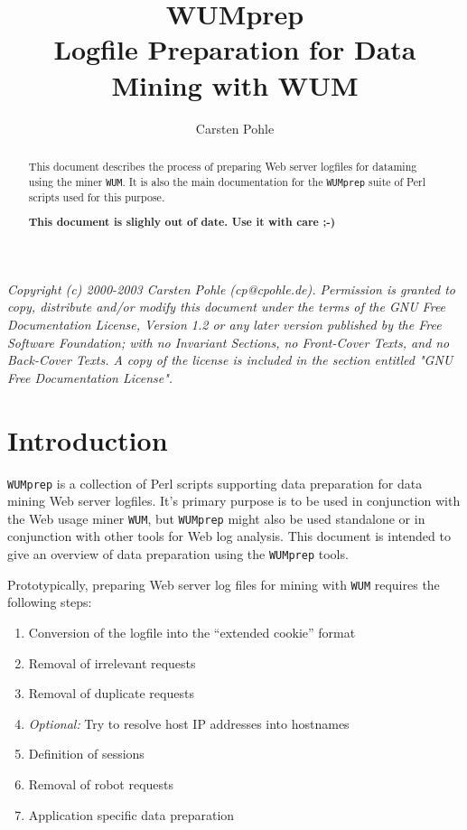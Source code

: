 \documentclass[a4paper]{article}
\begin{document}
\title{WUMprep \\  
  Logfile Preparation for Data Mining with WUM}
\author{Carsten Pohle}
\maketitle

\textsl{Copyright (c) 2000-2003 Carsten Pohle (cp@cpohle.de).
Permission is granted to copy, distribute and/or modify this document under
the terms of the GNU Free Documentation License, Version 1.2 or any later
version published by the Free Software Foundation; with no Invariant
Sections, no Front-Cover Texts, and no Back-Cover Texts.  A copy of the
license is included in the section entitled "GNU Free Documentation
License".
}

\begin{abstract}
  This document describes the process of preparing Web server logfiles for
  dataming using the miner \texttt{WUM}. It is also the main documentation
  for the \texttt{WUMprep} suite of Perl scripts used for this purpose.

\textbf{This document is slighly out of date. Use it with care ;-)}
\end{abstract}

\section{Introduction}

\texttt{WUMprep} is a collection of Perl scripts supporting data preparation
for data mining Web server logfiles. It's primary purpose is to be used in
conjunction with the Web usage miner \texttt{WUM}, but \texttt{WUMprep} might
also be used standalone or in conjunction with other tools for Web log
analysis. This document is intended to give an overview of data preparation
using the \texttt{WUMprep} tools.

Prototypically, preparing Web server log files for mining with \texttt{WUM}
requires the following steps:

\begin{enumerate}
\item Conversion of the logfile into the ``extended cookie'' format
\item Removal of irrelevant requests
\item Removal of duplicate requests
\item \textit{Optional:} Try to resolve host IP addresses into hostnames
\item Definition of sessions
\item Removal of robot requests
\item Application specific data preparation
\end{enumerate}
\end{document}
